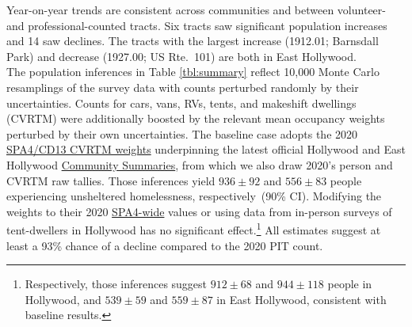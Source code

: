 \documentclass[11pt]{article}
\def\resp{respectively}
\begin{document}
Year-on-year trends are consistent across communities and between volunteer- and professional-counted tracts.
Six tracts saw significant population increases and 14 saw declines. The tracts with the largest increase (1912.01;
Barnsdall Park) and decrease (1927.00; US Rte.\ 101) are both in East Hollywood.\\

 The population inferences in Table \ref{tbl:summary} %
reflect 10,000 Monte Carlo resamplings of the survey data with 
counts perturbed randomly by their uncertainties. Counts for cars, vans, RVs, tents, and 
makeshift dwellings (CVRTM) were additionally boosted by the relevant mean occupancy weights 
perturbed by their own uncertainties. The baseline case adopts the 2020 
\href{https://www.lahsa.org/documents?id=4635-usc-2018-2020-multipliers-and-estimates-overview}
{SPA4/CD13 CVRTM weights} underpinning the latest official Hollywood and East Hollywood 
\href{https://www.lahsa.org/documents?id=4686-2020-greater-los-angeles-city-community-homelessness-report-service-planning-area-4.pdf}
{Community Summaries}, from which we also draw 2020's person and CVRTM raw tallies. Those inferences yield 
$936\pm92$ and $556\pm83$ people experiencing unsheltered homelessness, \resp\ (90\% CI). Modifying the weights
to their 2020 \href{https://www.lahsa.org/documents?id=4693-2020-greater-los-angeles-homeless-count-cvrtm-conversion-factors}
{SPA4-wide} values or using data from in-person surveys of tent-dwellers in Hollywood has no
significant effect.\footnote{Respectively, those inferences suggest $912\pm68$ and $944\pm118$ people
in Hollywood, and $539\pm59$ and $559\pm87$ in East Hollywood, consistent with baseline results.} 
All estimates suggest at least a 93\% chance of a decline compared to the 2020 PIT count.
\end{document}
